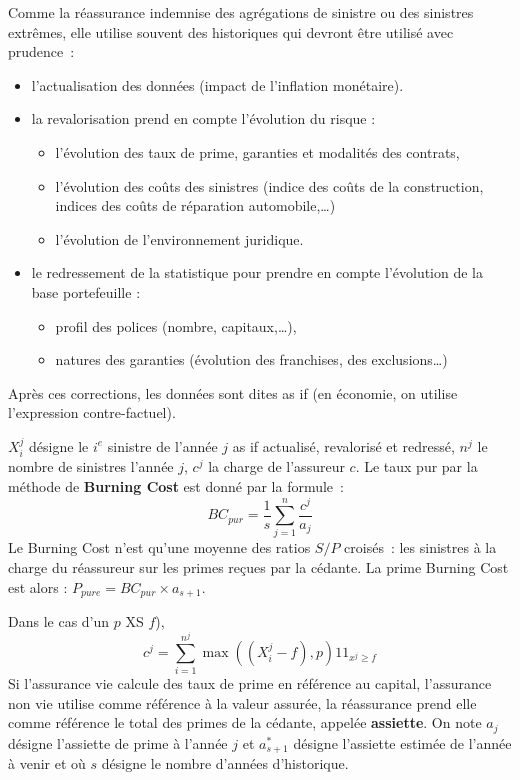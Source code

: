 \begin{f}
	[Les données en réassurance ]

Comme la réassurance indemnise des agrégations de sinistre ou des sinistres extrêmes, elle utilise souvent des historiques qui devront être utilisé avec prudence~:
\begin{itemize}
	\item l'actualisation des données (impact de l'inflation monétaire).
	\item la revalorisation prend en compte l'évolution du risque :
	\begin{itemize}
		\item l'évolution des taux de prime, garanties et modalités des contrats,
		\item l'évolution des coûts des sinistres (indice des coûts de la construction, indices des coûts de réparation automobile,\ldots)
		\item l'évolution de l'environnement juridique.
	\end{itemize}
	\item le redressement de la statistique pour prendre en compte l'évolution de la base  portefeuille :
	\begin{itemize}
		\item profil des polices (nombre, capitaux,\ldots),
		\item natures des garanties (évolution des franchises, des exclusions\ldots)
	\end{itemize}
\end{itemize}
Après ces corrections, les données sont dites \og as if \fg (en économie, on utilise l'expression contre-factuel).

\end{f}


\begin{f}
	
	\(X_{i}^{j}\) désigne le \(i^{e}\) sinistre  de l'année \(j\) \og{}as if\fg{} actualisé, revalorisé et  redressé,
\(n^j\) le nombre de sinistres l'année \(j\), \(c^{j}\) la charge de l'assureur \(c\).
Le taux pur  par la méthode de \textbf{Burning Cost} est donné par la formule~:
\[
BC_{pur}=\frac{1}{s}\sum_{j=1}^{n}\frac{c^{j}}{a_{j}}
\] 
Le Burning Cost n'est qu'une moyenne des ratios \(S/P\) croisés~: les sinistres à la charge du réassureur sur les primes reçues par la cédante.
La prime Burning Cost est alors : \(P_{pure}=BC_{pur}\times a_{s+1}\).

Dans le cas d'un \(p\) XS \(f\)), \[
c^{j}=\sum_{i=1}^{n^j}\max\left(  \left( X_{i}^{j}-f\right),p\right) 1\!\!1_{x^{j}\geq f}
\]
Si l'assurance vie calcule des taux de prime en référence au capital, l'assurance non vie utilise comme  référence à la valeur assurée, la réassurance prend elle comme référence le total des primes de la cédante, appelée \textbf{assiette}.
On note \(a_{j}\) désigne l'assiette de prime à l'année \(j\) et \(a_{s+1}^{*}\) désigne l'assiette estimée de l'année à venir et où \(s\) désigne le nombre d'années d'historique.
\end{f}



